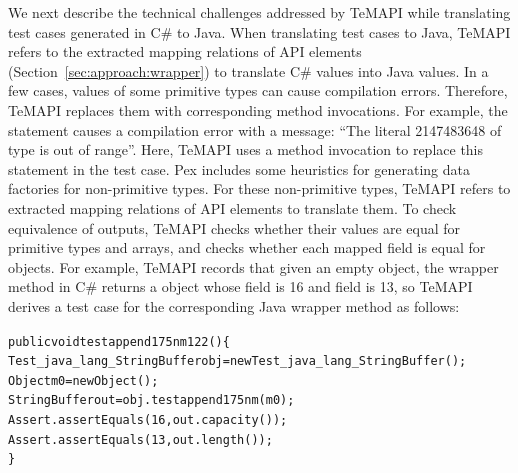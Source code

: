 
We next describe the technical challenges addressed by TeMAPI while translating test cases generated in C\# to Java. When translating test cases to Java, TeMAPI refers to the extracted mapping relations of API elements (Section~\ref{sec:approach:wrapper}) to translate C\# values into Java values. In a few cases, values of some primitive types can cause compilation errors. Therefore, TeMAPI replaces them with corresponding method invocations. For example, the  statement causes a compilation error with a message: ``The literal 2147483648 of type  is out of range''. Here, TeMAPI uses a method invocation to replace this statement in the  test case. Pex includes some heuristics for generating data factories for non-primitive types. For these non-primitive types, TeMAPI refers to extracted mapping relations of API elements to translate them. To check equivalence of outputs, TeMAPI checks whether their values are equal for primitive types and arrays, and checks whether each mapped field is equal for objects. For example, TeMAPI records that given an empty object, the  wrapper method in C\# returns a  object whose  field is 16 and  field is 13, so TeMAPI derives a test case for the corresponding Java wrapper method as follows:

\begin{CodeOut}%
\begin{alltt}
public void testappend175nm122()\{
  Test_java_lang_StringBuffer obj = new Test_java_lang_StringBuffer();
  Object m0 = new Object();
  StringBuffer out = obj.testappend175nm(m0);
  Assert.assertEquals(16, out.capacity());	
  Assert.assertEquals(13, out.length());
\}
\end{alltt}
\end{CodeOut}%

